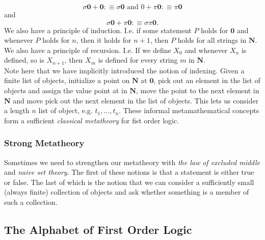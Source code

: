 $$\sigma\mathbf{0}+\mathbf{0} :\equiv \sigma\mathbf{0} \text{ and } 0 + \pi\mathbf{0} :\equiv \pi\mathbf{0}$$
and 
$$\sigma\mathbf{0} + \pi\mathbf{0} :\equiv \sigma\pi \mathbf{0}.$$
We also have a principle of induction. I.e. if some statement $P$ holds for $\mathbf{0}$ and whenever $P$ holds for $n$, then it holds for $n+1$, then $P$ holds for all strings in $\mathbf{N}$.\\ 
We also have a principle of recursion. I.e. If we define $X_0$ and whenever $X_n$ is defined, so is $X_{n+1}$, then $X_m$ is defined for every string $m$ in $\mathbf{N}$.\\
Note here that we have implicitly introduced the notion of indexing. Given a finite list of objects, initialize a point on $\mathbf{N}$ at $\mathbf{0}$, pick out an element in the list of objects and assign the value point at in $\mathbf{N}$, move the point to the next element in $\mathbf{N}$ and move pick out the next element in the list of objects. This lets us consider a length $n$ list of object, e.g. $t_1,\dots,t_n$. These informal metamathematical concepts form a sufficient \emph{classical metatheory} for fist order logic. 
\subsubsection{Strong Metatheory}
Sometimes we need to strengthen our metatheory with \emph{the law of excluded middle} and \emph{naive set theory}. The first of these notions is that a statement is either true or false. The last of which is the notion that we can consider a sufficiently small (always finite) collection of objects and ask whether something is a member of such a collection. 
\subsection{The Alphabet of First Order Logic}
